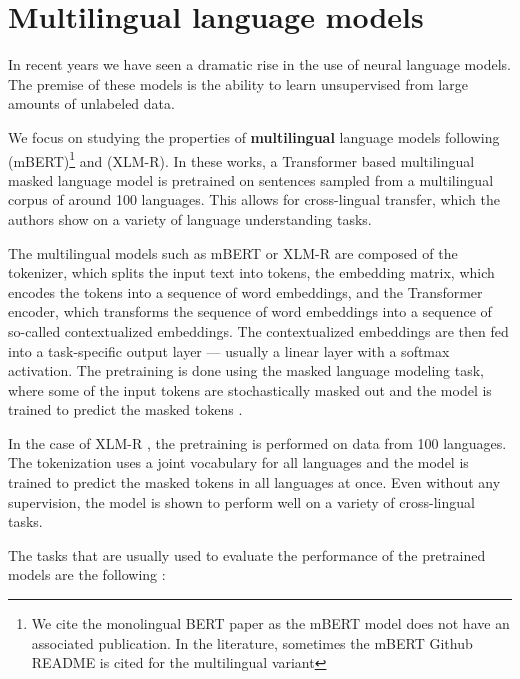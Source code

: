 \section{Multilingual language models}

In recent years we have seen a dramatic rise in the use of neural language models. The premise of these models is the ability to learn unsupervised from large amounts of unlabeled data. 

We focus on studying the properties of \textbf{multilingual} language models following \citet{devlin_bert_2019} (mBERT)\footnote{We cite the monolingual BERT paper as the mBERT model does not have an associated publication. In the literature, sometimes the mBERT Github README is cited for the multilingual variant\cite{devlin_bertmultilingualmd_2019}} and \citet{conneau_unsupervised_2020} (XLM-R). In these works, a Transformer \cite{vaswani_attention_nodate} based multilingual masked language model is pretrained on sentences sampled from a multilingual corpus of around 100 languages. This allows for cross-lingual transfer, which the authors show on a variety of language understanding tasks.

The multilingual models such as mBERT or XLM-R are composed of the tokenizer, which splits the input text into tokens, the embedding matrix, which encodes the tokens into a sequence of word embeddings, and the Transformer encoder, which transforms the sequence of word embeddings into a sequence of so-called contextualized embeddings. The contextualized embeddings are then fed into a task-specific output layer --- usually a linear layer with a softmax activation. The pretraining is done using the masked language modeling task, where some of the input tokens are stochastically masked out and the model is trained to predict the masked tokens \cite{devlin_bert_2019}.

In the case of XLM-R \cite{conneau_unsupervised_2020}, the pretraining is performed on data from 100 languages. The tokenization uses a joint vocabulary for all languages and the model is trained to predict the masked tokens in all languages at once. Even without any supervision, the model is shown to perform well on a variety of cross-lingual tasks.

The tasks that are usually used to evaluate the performance of the pretrained models are the following \cite{ruder_xtreme-r_2021}:


